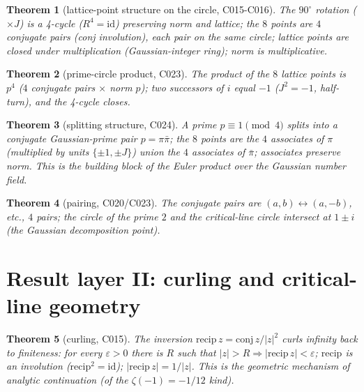 \documentclass[11pt]{article}
\newtheorem{theorem}{Theorem}
\theoremstyle{remark}
\begin{document}
\begin{theorem}[lattice-point structure on the circle, C015-C016]
\label{thm:lattice}
The $90^\circ$ rotation ($\times J$) is a 4-cycle ($R^4=\mathrm{id}$)
preserving norm and lattice; the $8$ points are $4$ conjugate pairs (conj
involution), each pair on the same circle; lattice points are closed under
multiplication (Gaussian-integer ring); norm is multiplicative.
\end{theorem}

\begin{theorem}[prime-circle product, C023]
\label{thm:product}
The product of the $8$ lattice points is $p^4$ ($4$ conjugate pairs $\times$
norm $p$); two successors of $i$ equal $-1$ ($J^2=-1$, half-turn), and the
4-cycle closes.
\end{theorem}

\begin{theorem}[splitting structure, C024]
\label{thm:splitting}
A prime $p\equiv 1 \pmod 4$ splits into a conjugate Gaussian-prime pair
$p=\pi\bar{\pi}$; the $8$ points are the $4$ associates of $\pi$ (multiplied
by units $\{\pm 1,\pm J\}$) union the $4$ associates of $\bar{\pi}$;
associates preserve norm. This is the building block of the Euler product
over the Gaussian number field.
\end{theorem}

\begin{theorem}[pairing, C020/C023]
\label{thm:pairing}
The conjugate pairs are $(a,b)\leftrightarrow(a,-b)$, etc., $4$ pairs; the
circle of the prime $2$ and the critical-line circle intersect at $1\pm i$
(the Gaussian decomposition point).
\end{theorem}

\section{Result layer II: curling and critical-line geometry}
\label{sec:layerII}

\begin{theorem}[curling, C015]
\label{thm:curling}
The inversion $\mathrm{recip}\,z=\mathrm{conj}\,z/|z|^2$ curls infinity back
to finiteness: for every $\varepsilon>0$ there is $R$ such that
$|z|>R \Rightarrow |\mathrm{recip}\,z|<\varepsilon$; $\mathrm{recip}$ is an
involution ($\mathrm{recip}^2=\mathrm{id}$); $|\mathrm{recip}\,z|=1/|z|$.
This is the geometric mechanism of analytic continuation (of the
$\zeta(-1)=-1/12$ kind).
\end{theorem}
\end{document}
